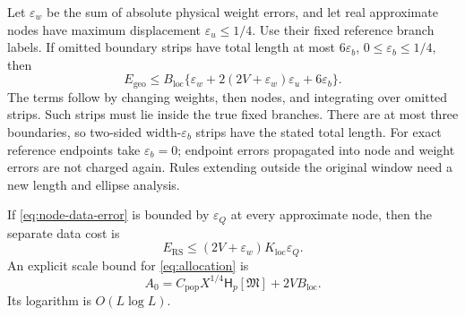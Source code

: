 Let \(\varepsilon_w\) be the sum of absolute physical weight
errors, and let real approximate nodes have maximum displacement
\(\varepsilon_u\le1/4\). Use their fixed reference branch labels.
If omitted boundary strips have total length at most
\(6\varepsilon_b\), \(0\le\varepsilon_b\le1/4\), then
\begin{equation}
 E_{\mathrm{geo}}\le B_{\mathrm{loc}}
   \{\varepsilon_w+2(2V+\varepsilon_w)\varepsilon_u
                                      +6\varepsilon_b\}.
 \label{eq:geometry-error}
\end{equation}
The terms follow by changing weights, then nodes, and integrating
over omitted strips. Such strips must lie inside the true fixed
branches. There are at most three boundaries, so two-sided
width-\(\varepsilon_b\) strips have the stated total length.
For exact reference endpoints take \(\varepsilon_b=0\);
endpoint errors propagated into node and weight errors are not
charged again. Rules extending outside the original window need
a new length and ellipse analysis.

If \eqref{eq:node-data-error} is bounded by \(\varepsilon_Q\)
at every approximate node, then the separate data cost is
\begin{equation}
 E_{\mathrm{RS}}\le(2V+\varepsilon_w)K_{\mathrm{loc}}\varepsilon_Q.
 \label{eq:RS-data-budget}
\end{equation}
An explicit scale bound for \eqref{eq:allocation} is
\begin{equation}
 A_0=C_{\mathrm{pop}}X^{1/4}\mathsf H_p[\mathfrak M]
                                      +2VB_{\mathrm{loc}}.
 \label{eq:A0}
\end{equation}
Its logarithm is \(O(L\log L)\).

